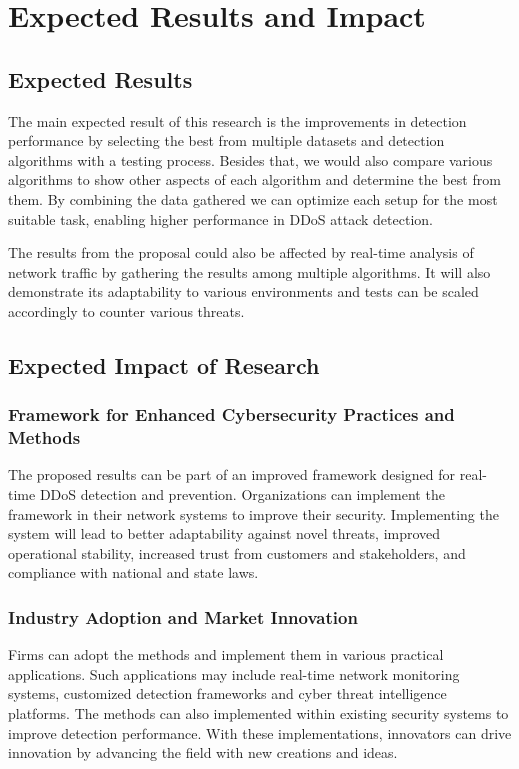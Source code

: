 \documentclass[a4paper, 12pt]{article}
\begin{document}
\clearpage

\section{Expected Results and Impact}

\subsection{Expected Results}
The main expected result of this research is the improvements in detection performance by selecting the best from multiple datasets and detection algorithms with a testing process. Besides that, we would also compare various algorithms to show other aspects of each algorithm and determine the best from them. By combining the data gathered we can optimize each setup for the most suitable task, enabling higher performance in DDoS attack detection. 

The results from the proposal could also be affected by real-time analysis of network traffic by gathering the results among multiple algorithms. It will also demonstrate its adaptability to various environments and tests can be scaled accordingly to counter various threats. 

\subsection{Expected Impact of Research}

\subsubsection{ Framework for Enhanced Cybersecurity Practices and Methods }

The proposed results can be part of an improved framework designed for real-time DDoS detection and prevention. Organizations can implement the framework in their network systems to improve their security. Implementing the system will lead to better adaptability against novel threats, improved operational stability, increased trust from customers and stakeholders, and compliance with national and state laws. 

\subsubsection{ Industry Adoption and Market Innovation }

Firms can adopt the methods and implement them in various practical applications. Such applications may include real-time network monitoring systems, customized detection frameworks and cyber threat intelligence platforms. The methods can also implemented within existing security systems to improve detection performance. With these implementations, innovators can drive innovation by advancing the field with new creations and ideas.
\end{document}
